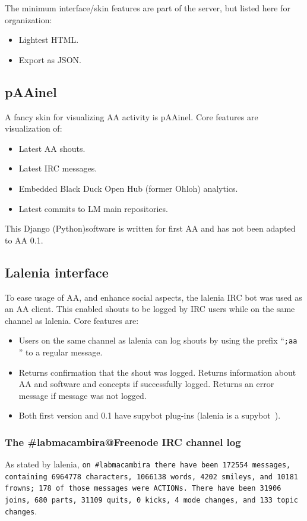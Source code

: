 \documentclass[12pt,fleqn]{article}
\begin{document}
The minimum interface/skin features are part of the server, but listed here for organization:
\begin{itemize}
    \item Lightest HTML.
    \item Export as JSON.
\end{itemize}

\subsection{pAAinel}\label{sec:aaPaainel}
A fancy skin for visualizing AA activity is pAAinel.
Core features are visualization of:
\begin{itemize}
    \item Latest AA shouts.
    \item Latest IRC messages.
    \item Embedded Black Duck Open Hub (former Ohloh) analytics.
    \item Latest commits to LM main repositories.
\end{itemize}

This Django (Python)software is written for first AA and has not been adapted to AA 0.1.

\subsection{Lalenia interface}\label{sec:lalenia}
To ease usage of AA, and enhance social aspects, the lalenia IRC bot was used as an AA client.
This enabled shouts to be logged by IRC users while on the same channel as lalenia.
Core features are:
\begin{itemize}
    \item Users on the same channel as lalenia can log shouts by using the prefix ``\texttt{;aa }'' to a regular message.
    \item Returns confirmation that the shout was logged.
	    Returns information about AA and software and concepts if successfully logged.
		Returns an error message if message was not logged.
    \item Both first version and 0.1 have supybot plug-ins (lalenia is a supybot~\citep{supybot}).
\end{itemize}

\subsubsection{The \#labmacambira@Freenode IRC channel log}\label{sec:cl}
As stated by lalenia, {\tt on \#labmacambira there have been 172554 messages, containing 6964778 characters, 1066138 words, 4202 smileys, and 10181 frowns; 178 of those messages were ACTIONs.  There have been 31906 joins, 680 parts, 31109 quits, 0 kicks, 4 mode changes, and 133 topic changes}.
\end{document}
